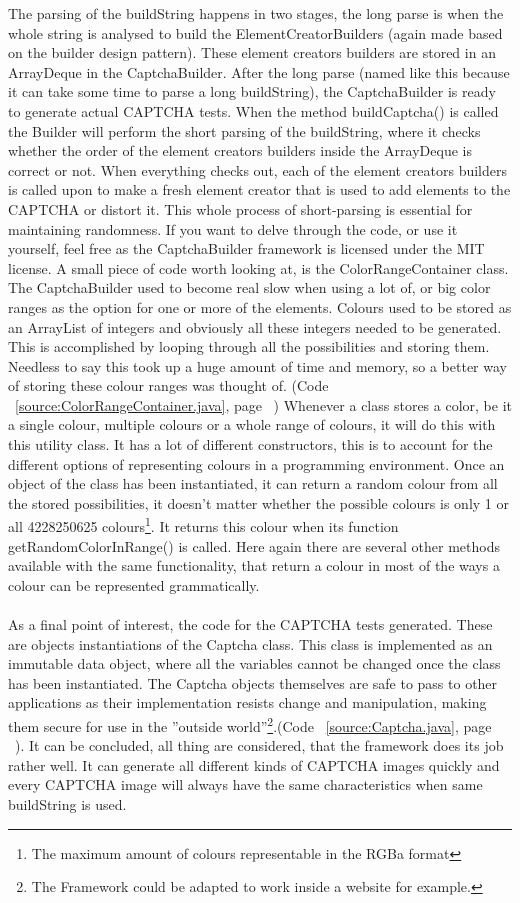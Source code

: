 \documentclass[pdftex,a4paper,12pt,twoside]{report}
\theoremstyle{plain} \newtheorem{theorem}{Theorem} \newtheorem{proposition}{Proposition} \newtheorem{lemma}{Lemma} \newtheorem*{corollary}{Corollary}
\theoremstyle{definition} \newtheorem{definition}{Definition} \newtheorem{conjecture}{Conjecture} \newtheorem*{example}{Example} \newtheorem{algorithm}{Algorithm}
\theoremstyle{remark} \newtheorem*{remark}{Remark} \newtheorem*{note}{Note} \newtheorem{case}{Case}
\begin{document}
The parsing of the buildString happens in two stages, the long parse is when the whole string is analysed to build the ElementCreatorBuilders (again made based on the builder design pattern). These element creators builders are stored in an ArrayDeque in the CaptchaBuilder. After the long parse (named like this because it can take some time to parse a long buildString), the CaptchaBuilder is ready to generate actual CAPTCHA tests. When the method buildCaptcha() is called the Builder will perform the short parsing of the buildString, where it checks whether the order of the element creators builders inside the ArrayDeque is correct or not. When everything checks out, each of the element creators builders is called upon to make a fresh element creator that is used to add elements to the CAPTCHA or distort it. This whole process of short-parsing is essential for maintaining randomness. If you want to delve through the code, or use it yourself, feel free as the CaptchaBuilder framework is licensed under the MIT license. A small piece of code worth looking at, is the ColorRangeContainer class. The CaptchaBuilder used to become real slow when using a lot of, or big color ranges as the option for one or more of the elements. Colours used to be stored as an ArrayList of integers and obviously all these integers needed to be generated. This is accomplished by looping through all the possibilities and storing them. Needless to say this took up a huge amount of time and memory, so a better way of storing these colour ranges was thought of. (Code ~\ref{source:ColorRangeContainer.java}, page ~\pageref{source:ColorRangeContainer.java})
Whenever a class stores a color, be it a single colour, multiple colours or a whole range of colours, it will do this with this utility class. It has a lot of different constructors, this is to account for the different options of representing colours in a programming environment. Once an object of the class has been instantiated, it can return a random colour from all the stored possibilities, it doesn't matter whether the possible colours is only 1 or all 4228250625 colours\footnote{The maximum amount of colours representable in the RGBa format}. It returns this colour when its function getRandomColorInRange() is called. Here again there are several other methods available with the same functionality, that return a colour in most of the ways a colour can be represented grammatically.\\\\
As a final point of interest, the code for the CAPTCHA tests generated. These are objects instantiations of the Captcha class. This class is implemented as an immutable data object, where all the variables cannot be changed once the class has been instantiated. The Captcha objects themselves are safe to pass to other applications as their implementation resists change and manipulation, making them secure for use in the ''outside world''\footnote{The Framework could be adapted to work inside a website for example.}.(Code ~\ref{source:Captcha.java}, page ~\pageref{source:Captcha.java}). It can be concluded, all thing are considered, that the framework does its job rather well. It can generate all different kinds of CAPTCHA images quickly and every CAPTCHA image will always have the same characteristics when same buildString is used.
\end{document}
